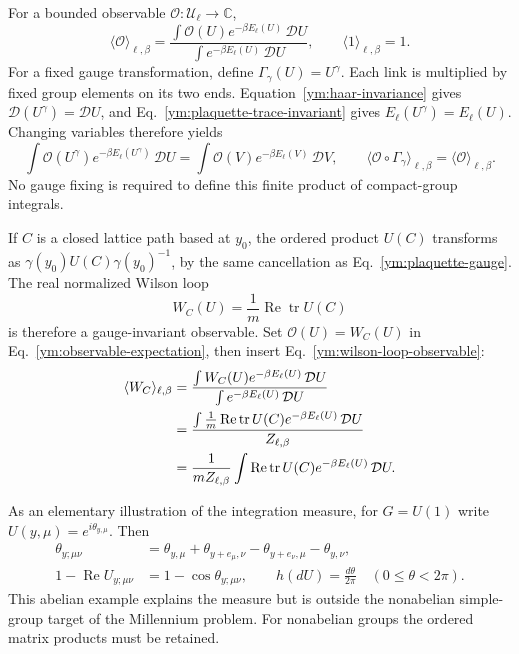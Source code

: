 For a bounded observable $\mathcal O\colon\mathcal U_\ell\to\mathbb C$,
\begin{equation}\label{ym:observable-expectation}
 \langle\mathcal O\rangle_{\ell,\beta}
 =\frac{\int\mathcal O(U)e^{-\beta E_\ell(U)}\,\mathcal DU}
        {\int e^{-\beta E_\ell(U)}\,\mathcal DU},
 \qquad\langle1\rangle_{\ell,\beta}=1.
\end{equation}
For a fixed gauge transformation, define $\Gamma_\gamma(U)=U^\gamma$.
Each link is multiplied by fixed group elements on its two ends. Equation~\eqref{ym:haar-invariance} gives
$\mathcal D(U^\gamma)=\mathcal DU$, and
Eq.~\eqref{ym:plaquette-trace-invariant} gives
$E_\ell(U^\gamma)=E_\ell(U)$. Changing variables therefore yields
\begin{equation}\label{ym:measure-gauge-invariance}
 \int\mathcal O(U^\gamma)e^{-\beta E_\ell(U^\gamma)}\,\mathcal DU
 =\int\mathcal O(V)e^{-\beta E_\ell(V)}\,\mathcal DV,
 \qquad \langle\mathcal O\circ\Gamma_\gamma\rangle_{\ell,\beta}
 =\langle\mathcal O\rangle_{\ell,\beta}.
\end{equation}
No gauge fixing is required to define this finite product of compact-group
integrals.

If $C$ is a closed lattice path based at $y_0$, the ordered product $U(C)$
transforms as $\gamma(y_0)U(C)\gamma(y_0)^{-1}$, by the same cancellation
as Eq.~\eqref{ym:plaquette-gauge}. The real normalized Wilson loop
\begin{equation}\label{ym:wilson-loop-observable}
 W_C(U)=\frac1m\operatorname{Re}\operatorname{tr}U(C)
\end{equation}
is therefore a gauge-invariant observable. Set
$\mathcal O(U)=W_C(U)$ in Eq.~\eqref{ym:observable-expectation}, then insert
Eq.~\eqref{ym:wilson-loop-observable}:
\begin{align}
 \langle W_C\rangle_{\ell,\beta}
 &=\frac{\int W_C(U)e^{-\beta E_\ell(U)}\,\mathcal DU}
        {\int e^{-\beta E_\ell(U)}\,\mathcal DU}\notag\\
 &=\frac{\int \frac1m\operatorname{Re}\operatorname{tr}U(C)
            e^{-\beta E_\ell(U)}\,\mathcal DU}
        {Z_{\ell,\beta}}\notag\\
 &=\frac1{mZ_{\ell,\beta}}
       \int\operatorname{Re}\operatorname{tr}U(C)
             e^{-\beta E_\ell(U)}\,\mathcal DU.
 \label{ym:wilson-loop-expectation}
\end{align}

As an elementary illustration of the integration measure, for $G=U(1)$
write $U(y,\mu)=e^{i\theta_{y,\mu}}$. Then
\begin{align}
 \theta_{y;\mu\nu}
 &=\theta_{y,\mu}+\theta_{y+e_\mu,\nu}
       -\theta_{y+e_\nu,\mu}-\theta_{y,\nu},\\
 1-\operatorname{Re}U_{y;\mu\nu}&=1-\cos\theta_{y;\mu\nu},
 \qquad h(dU)=\frac{d\theta}{2\pi}\quad(0\le\theta<2\pi).
\end{align}
This abelian example explains the measure but is outside the nonabelian
simple-group target of the Millennium problem. For nonabelian groups the
ordered matrix products must be retained.

